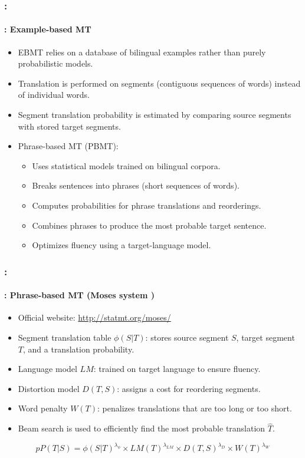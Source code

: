 \documentclass[xcolor=table]{beamer}
\begin{document}
\begin{frame}
	\frametitle{\insertshortsubtitle: \insertsection}
	\framesubtitle{\insertsubsection: Example-based MT}
	
	\begin{itemize}
		\item EBMT relies on a database of bilingual examples rather than purely probabilistic models.
		\item Translation is performed on segments (contiguous sequences of words) instead of individual words.
		\item Segment translation probability is estimated by comparing source segments with stored target segments.
		\item Phrase-based MT (PBMT):
		\begin{itemize}
			\item Uses statistical models trained on bilingual corpora.
			\item Breaks sentences into phrases (short sequences of words).
			\item Computes probabilities for phrase translations and reorderings.
			\item Combines phrases to produce the most probable target sentence.
			\item Optimizes fluency using a target-language model.
		\end{itemize}
	\end{itemize}
	
\end{frame}

\begin{frame}
	\frametitle{\insertshortsubtitle: \insertsection}
	\framesubtitle{\insertsubsection: Phrase-based MT (Moses system \cite{07-koehn-al})}
	
	\begin{itemize}
		\item Official website: \url{http://statmt.org/moses/}
		\item Segment translation table $\phi(S|T)$: stores source segment $S$, target segment $T$, and a translation probability.
		\item Language model $LM$: trained on target language to ensure fluency.
		\item Distortion model $D(T,S)$: assigns a cost for reordering segments.
		\item Word penalty $W(T)$: penalizes translations that are too long or too short.
		\item Beam search is used to efficiently find the most probable translation $\hat{T}$.
	\end{itemize}
	
	\[
	pP(T|S) = \phi(S|T)^{\lambda_\phi} \times LM(T)^{\lambda_{LM}} \times D(T,S)^{\lambda_D} \times W(T)^{\lambda_W}
	\]
	
\end{frame}
\end{document}
